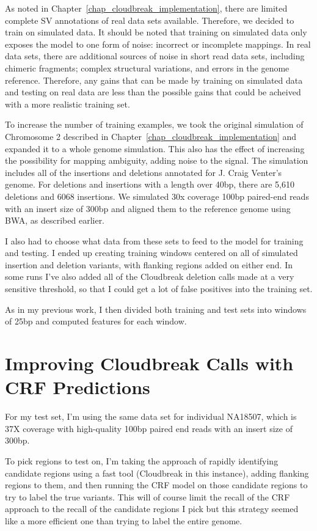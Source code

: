 As noted in Chapter~\ref{chap_cloudbreak_implementation}, there are limited complete SV annotations of real data sets available. Therefore, we decided to train on simulated data. It should be noted that training on simulated data only exposes the model to one form of noise: incorrect or incomplete mappings. In real data sets, there are additional sources of noise in short read data sets, including chimeric fragments; complex structural variations, and errors in the genome reference. Therefore, any gains that can be made by training on simulated data and testing on real data are less than the possible gains that could be acheived with a more realistic training set.

To increase the number of training examples, we took the original simulation of Chromosome 2 described in Chapter~\ref{chap_cloudbreak_implementation} and expanded it to a whole genome simulation. This also has the effect of increasing the possibility for mapping ambiguity, adding noise to the signal. The simulation includes all of the insertions and deletions annotated for J. Craig Venter's genome. For deletions and insertions with a length over 40bp, there are 5,610 deletions and 6068 insertions. We simulated 30x coverage 100bp paired-end reads with an insert size of 300bp and aligned them to the reference genome using BWA, as described earlier. 

I also had to choose what data from these sets to feed to the model for training and testing. I ended up creating training windows centered on all of simulated insertion and deletion variants, with flanking regions added on either end. In some runs I've also added all of the Cloudbreak deletion calls made at a very sensitive threshold, so that I could get a lot of false positives into the training set. 

As in my previous work, I then divided both training and test sets into windows of 25bp and computed features for each window.

\section{Improving Cloudbreak Calls with CRF Predictions}

For my test set, I'm using the same data set for individual NA18507, which is 37X coverage with high-quality 100bp paired end reads with an insert size of 300bp. 


To pick regions to test on, I'm taking the approach of rapidly identifying candidate regions using a fast tool (Cloudbreak in this instance), adding flanking regions to them, and then running the CRF model on those candidate regions to try to label the true variants. This will of course limit the recall of the CRF approach to the recall of the candidate regions I pick but this strategy seemed like a more efficient one than trying to label the entire genome.

